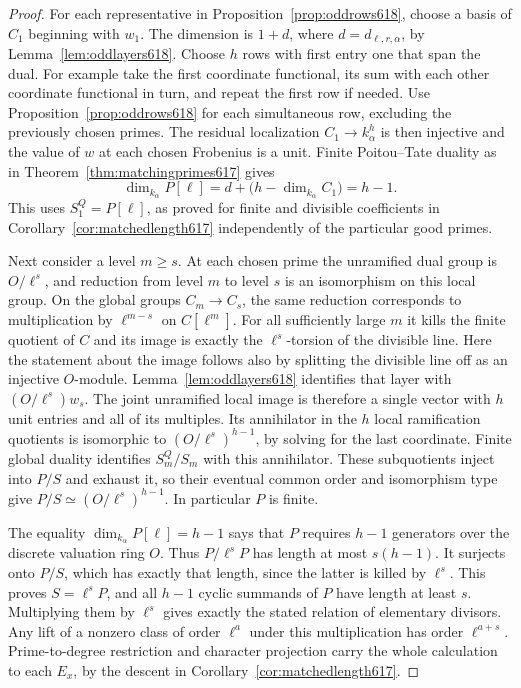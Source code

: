 \documentclass[a4paper,11pt]{article}
\theoremstyle{definition}
\theoremstyle{remark}
\numberwithin{equation}{section}
\begin{document}
\begin{proof}
For each representative in Proposition~\ref{prop:oddrows618}, choose
a basis of \(C_1\) beginning with \(w_1\). The dimension is \(1+d\),
where \(d=d_{\ell,r,\alpha}\), by Lemma~\ref{lem:oddlayers618}.
Choose \(h\) rows with first entry one that span the dual. For
example take the first coordinate functional, its sum with each
other coordinate functional in turn, and repeat the first row if
needed. Use Proposition~\ref{prop:oddrows618} for each simultaneous
row, excluding the previously chosen primes. The residual
localization \(C_1\to k_\alpha^h\) is then injective and the value
of \(w\) at each chosen Frobenius is a unit. Finite Poitou--Tate
duality as in Theorem~\ref{thm:matchingprimes617} gives
\[
 \dim_{k_\alpha}P[\ell]
   =d+\big(h-\dim_{k_\alpha}C_1\big)=h-1.
\]
This uses \(S_1^Q=P[\ell]\), as proved for finite and divisible
coefficients in Corollary~\ref{cor:matchedlength617} independently
of the particular good primes.

Next consider a level \(m\ge s\). At each chosen prime the
unramified dual group is \(O/\ell^s\), and reduction from level
\(m\) to level \(s\) is an isomorphism on this local group. On the
global groups \(C_m\to C_s\), the same reduction corresponds to
multiplication by \(\ell^{m-s}\) on \(C[\ell^m]\). For all
sufficiently large \(m\) it kills the finite quotient of \(C\)
and its image is exactly the \(\ell^s\)-torsion of the
divisible line. Here the statement about the image follows also
by splitting the divisible line off as an injective \(O\)-module.
Lemma~\ref{lem:oddlayers618} identifies that layer with
\((O/\ell^s)w_s\). The joint unramified local image is therefore
a single vector with \(h\) unit entries and all of its multiples.
Its annihilator in the \(h\) local ramification quotients is
isomorphic to \((O/\ell^s)^{h-1}\), by solving for the last
coordinate. Finite global duality identifies \(S_m^Q/S_m\) with
this annihilator. These subquotients inject into \(P/S\) and
exhaust it, so their eventual common order and isomorphism type
give \(P/S\simeq(O/\ell^s)^{h-1}\). In particular \(P\) is finite.

The equality \(\dim_{k_\alpha}P[\ell]=h-1\) says that \(P\)
requires \(h-1\) generators over the discrete valuation ring \(O\).
Thus \(P/\ell^sP\) has length at most \(s(h-1)\). It surjects
onto \(P/S\), which has exactly that length, since the latter is
killed by \(\ell^s\). This proves \(S=\ell^sP\), and all \(h-1\)
cyclic summands of \(P\) have length at least \(s\). Multiplying
them by \(\ell^s\) gives exactly the stated relation of elementary
divisors. Any lift of a nonzero class of order \(\ell^a\) under
this multiplication has order \(\ell^{a+s}\).
Prime-to-degree restriction and character projection carry the
whole calculation to each \(E_x\), by the descent in
Corollary~\ref{cor:matchedlength617}.
\end{proof}
\end{document}
